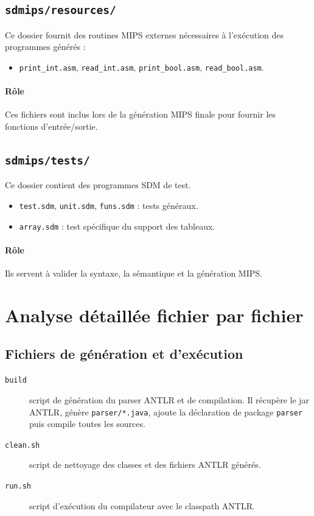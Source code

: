 \documentclass[a4paper,11pt]{article}
\begin{document}
\subsection{\texttt{sdmips/resources/}}
Ce dossier fournit des routines MIPS externes nécessaires à l'exécution des programmes générés :
\begin{itemize}
  \item \texttt{print_int.asm}, \texttt{read_int.asm}, \texttt{print_bool.asm}, \texttt{read_bool.asm}.
\end{itemize}

\paragraph{Rôle}
Ces fichiers sont inclus lors de la génération MIPS finale pour fournir les fonctions d'entrée/sortie.

\subsection{\texttt{sdmips/tests/}}
Ce dossier contient des programmes SDM de test.
\begin{itemize}
  \item \texttt{test.sdm}, \texttt{unit.sdm}, \texttt{funs.sdm} : tests généraux.
  \item \texttt{array.sdm} : test spécifique du support des tableaux.
\end{itemize}

\paragraph{Rôle}
Ils servent à valider la syntaxe, la sémantique et la génération MIPS.

\section{Analyse détaillée fichier par fichier}

\subsection{Fichiers de génération et d'exécution}
\begin{description}
  \item[\texttt{build}] script de génération du parser ANTLR et de compilation. Il récupère le jar ANTLR, génère \texttt{parser/*.java}, ajoute la déclaration de package \texttt{parser} puis compile toutes les sources.
  \item[\texttt{clean.sh}] script de nettoyage des classes et des fichiers ANTLR générés.
  \item[\texttt{run.sh}] script d'exécution du compilateur avec le classpath ANTLR.
\end{description}
\end{document}
